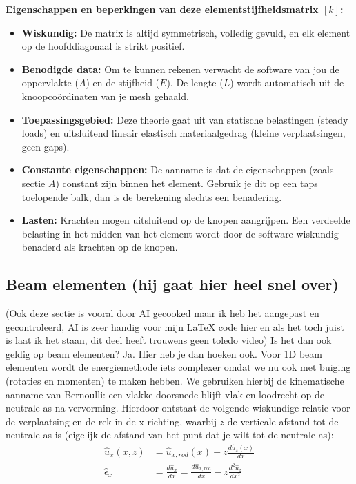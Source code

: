 \documentclass[a4paper,11pt,twoside]{report}
\begin{document}
\textbf{Eigenschappen en beperkingen van deze elementstijfheidsmatrix $[k]$:}
\begin{itemize}
    \item \textbf{Wiskundig:} De matrix is altijd symmetrisch, volledig gevuld, en elk element op de
          hoofddiagonaal is strikt positief.
    \item \textbf{Benodigde data:} Om te kunnen rekenen verwacht de software van jou de oppervlakte
          ($A$) en de stijfheid ($E$). De lengte ($L$) wordt automatisch uit de knoopcoördinaten van je
          mesh gehaald.
    \item \textbf{Toepassingsgebied:} Deze theorie gaat uit van statische belastingen (steady loads)
          en uitsluitend lineair elastisch materiaalgedrag (kleine verplaatsingen, geen gaps).
    \item \textbf{Constante eigenschappen:} De aanname is dat de eigenschappen (zoals sectie $A$)
          constant zijn binnen het element. Gebruik je dit op een taps toelopende balk, dan is de
          berekening slechts een benadering.
    \item \textbf{Lasten:} Krachten mogen uitsluitend op de knopen aangrijpen. Een verdeelde
          belasting in het midden van het element wordt door de software wiskundig benaderd als krachten
          op de knopen.
\end{itemize}
\subsection{Beam elementen (hij gaat hier heel snel over)}
(Ook deze sectie is vooral door AI gecooked maar ik heb het aangepast en gecontroleerd, AI is zeer
handig voor mijn LaTeX code hier en als het toch juist is laat ik het staan, dit deel heeft trouwens
geen toledo video)
\newline
\newline
Is het dan ook geldig op beam elementen? Ja. Hier heb je dan hoeken ook. Voor 1D beam elementen
wordt de energiemethode iets complexer omdat we nu ook met buiging (rotaties en momenten) te maken
hebben. We gebruiken hierbij de kinematische aanname van Bernoulli: een vlakke doorsnede blijft vlak
en loodrecht op de neutrale as na vervorming.
\newline
\newline
Hierdoor ontstaat de volgende wiskundige relatie voor de verplaatsing en de rek in de x-richting,
waarbij $z$ de verticale afstand tot de neutrale as is (eigelijk de afstand van het punt dat je wilt
tot de neutrale as):
\begin{align*}
    \hat{u}_x(x, z)  & = \hat{u}_{x,rod}(x) -z \frac{d\hat{u}_z(x)}{dx}                                   \\
    \hat{\epsilon}_x & = \frac{d\hat{u}_x}{dx} = \frac{d\hat{u}_{x,rod}}{dx} -z \frac{d^2\hat{u}_z}{dx^2}
\end{align*}
\end{document}
